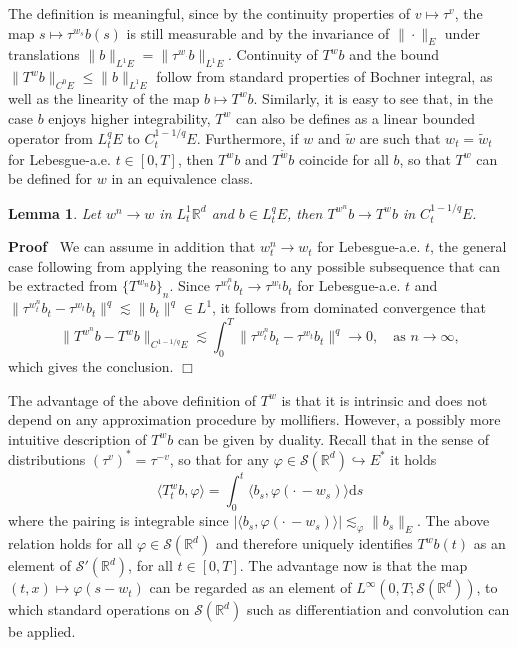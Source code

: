 \documentclass[10pt]{article}
\newcommand{\mathd}{\mathrm{d}}
\newenvironment{proof}{\noindent\textbf{Proof\ }}{\hspace*{\fill}$\Box$\medskip}
\newtheorem{lemma}{Lemma}
\begin{document}
The definition is meaningful, since by the continuity properties of $v \mapsto
\tau^v$, the map $s \mapsto \tau^{w_s} b (s)$ is still measurable and by the
invariance of $\| \cdot \|_E$ under translations $\| b \|_{L^1 E} = \|
\tau^{w_{\cdot}} b \|_{L^1 E}$. Continuity of $T^w b$ and the bound $\| T^w b
\|_{C^0 E} \leqslant \| b \|_{L^1 E}$ follow from standard properties of
Bochner integral, as well as the linearity of the map $b \mapsto T^w b$.
Similarly, it is easy to see that, in the case $b$ enjoys higher
integrability, $T^w$ can also be defines as a linear bounded operator from
$L^q_t E$ to $C_t^{1 - 1 / q} E$. Furthermore, if $w$ and $\tilde{w}$ are such
that $w_t = \tilde{w}_t$ for Lebesgue-a.e. $t \in [0, T]$, then $T^w b$ and
$T^{\tilde{w}} b$ coincide for all $b$, so that $T^w$ can be defined for $w$
in an equivalence class.

\begin{lemma}
  \label{sec3.1 lemma 1}Let $w^n \rightarrow w$ in $L^1_t \mathbb{R}^d$ and $b
  \in L^q_t E$, then $T^{w^n} b \rightarrow T^w b$ in $C_t^{1 - 1 / q} E.$
\end{lemma}

\begin{proof}
  We can assume in addition that $w^n_t \rightarrow w_t$ for Lebesgue-a.e.
  $t$, the general case following from applying the reasoning to any possible
  subsequence that can be extracted from $\{ T^{w_n} b \}_n$. Since
  $\tau^{w^n_t} b_t \rightarrow \tau^{w_t} b_t$ for Lebesgue-a.e. $t$ and $\|
  \tau^{w^n_t} b_t - \tau^{w_t} b_t \|^q \lesssim \| b_t \|^q \in L^1$, it
  follows from dominated convergence that
  \[ \| T^{w^n} b - T^w b \|_{C^{1 - 1 / q} E} \lesssim \int_0^T \|
     \tau^{w^n_t} b_t - \tau^{w_t} b_t \|^q \rightarrow 0, \quad \text{as } n
     \rightarrow \infty, \]
  which gives the conclusion. 
\end{proof}

The advantage of the above definition of $T^w$ is that it is intrinsic and
does not depend on any approximation procedure by mollifiers. However, a
possibly more intuitive description of $T^w b$ can be given by duality. Recall
that in the sense of distributions $(\tau^v)^{\ast} = \tau^{- v}$, so that for
any $\varphi \in \mathcal{S} (\mathbb{R}^d) \hookrightarrow E^{\ast}$ it holds
\[ \langle T^w_t b, \varphi \rangle = \int_0^t \langle b_s, \varphi \left(
   \cdot \, - w_s \right) \rangle \mathd s \]
where the pairing is integrable since $\left| \langle b_s, \varphi \left(
\cdot \, - w_s \right) \rangle \right| \lesssim_{\varphi} \| b_s \|_E$. The
above relation holds for all $\varphi \in \mathcal{S} (\mathbb{R}^d)$ and
therefore uniquely identifies $T^w b (t)$ as an element of $\mathcal{S}'
(\mathbb{R}^d)$, for all $t \in [0, T]$. The advantage now is that the map
$(t, x) \mapsto \varphi (s - w_t)$ can be regarded as an element of
$L^{\infty} (0, T ; \mathcal{S} (\mathbb{R}^d))$, to which standard operations
on $\mathcal{S} (\mathbb{R}^d)$ such as differentiation and convolution can be
applied.
\end{document}
